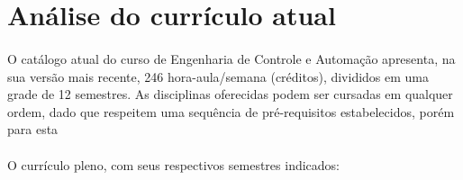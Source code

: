 \documentclass[12pt]{article} %
\begin{document}

\section{Análise do currículo atual}

\paragraph{}O catálogo atual do curso de Engenharia de Controle e Automação apresenta, na sua versão mais recente, 246 hora-aula/semana (créditos), divididos em uma grade de 12 semestres.  As disciplinas oferecidas podem ser cursadas em qualquer ordem, dado que respeitem uma sequência de pré-requisitos estabelecidos, porém para esta%

\paragraph{} O currículo pleno, com seus respectivos semestres indicados:
\end{document}
